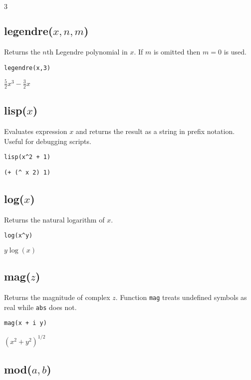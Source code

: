 \noindent
$3$

\subsection*{legendre($x,n,m$)}

Returns the $n$th Legendre polynomial in $x$.
If $m$ is omitted then $m=0$ is used.

{\color{blue}
\begin{verbatim}
legendre(x,3)
\end{verbatim}
}

\noindent
$\displaystyle \tfrac{5}{2}x^3-\tfrac{3}{2}x$

\subsection*{lisp($x$)}

Evaluates expression $x$ and returns the result as a
string in prefix notation.
Useful for debugging scripts.

{\color{blue}
\begin{verbatim}
lisp(x^2 + 1)
\end{verbatim}
}

\noindent
\verb$(+ (^ x 2) 1)$

\subsection*{log($x$)}

Returns the natural logarithm of $x$.

{\color{blue}
\begin{verbatim}
log(x^y)
\end{verbatim}
}

\noindent
$y\log(x)$

\subsection*{mag($z$)}

Returns the magnitude of complex $z$.
Function {\tt mag} treats undefined symbols as real while {\tt abs} does not.

{\color{blue}
\begin{verbatim}
mag(x + i y)
\end{verbatim}
}

\noindent
$\displaystyle (x^2+y^2)^{1/2}$

\subsection*{mod($a,b$)}

